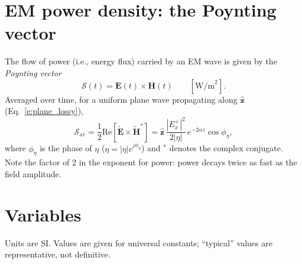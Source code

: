 \documentclass[11pt, oneside]{article}
\begin{document}
\section{EM power density: the Poynting vector}

The flow of power (i.e., energy flux) carried by an EM wave is given by the \emph{Poynting vector}
\begin{equation}
	\boldsymbol{\mathcal{S}}(t) = \mathbf{E}(t)\times\mathbf{H}(t) \qquad [\text{W/m}^2].
\end{equation}
Averaged over time, for a uniform plane wave propagating along $\hat{\mathbf{z}}$ (Eq.~\eqref{e:plane_lossy}),
\begin{equation}
	\label{e:poynting}
	\boldsymbol{\mathcal{S}}_\mathrm{av} = \frac{1}{2}\mathrm{Re}\left[\tilde{\mathbf{E}}\times\tilde{\mathbf{H}}^*\right]
	= \hat{\mathbf{z}}\,\frac{|E_x^+|^2}{2|\eta|}\,e^{-2\alpha z}\cos\phi_\eta,
\end{equation}
where $\phi_\eta$ is the phase of $\eta$ ($\eta = |\eta|e^{j\phi_\eta}$) and $^*$ denotes the complex conjugate. Note the factor of 2 in the exponent for power: power decays twice as fast as the field amplitude.

\section*{Variables}

Units are SI. Values are given for universal constants; ``typical'' values are representative, not definitive.
\end{document}
